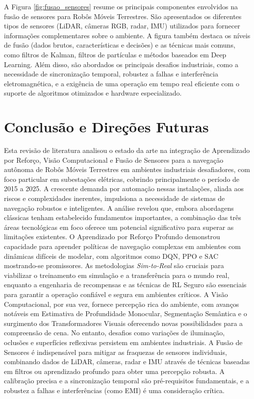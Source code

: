 A Figura \ref{fig:fusao_sensores} resume os principais componentes envolvidos na fusão de sensores para Robôs Móveis Terrestres. São apresentados os diferentes tipos de sensores (LiDAR, câmeras RGB, radar, IMU) utilizados para fornecer informações complementares sobre o ambiente. A figura também destaca os níveis de fusão (dados brutos, características e decisões) e as técnicas mais comuns, como filtros de Kalman, filtros de partículas e métodos baseados em Deep Learning. Além disso, são abordados os principais desafios industriais, como a necessidade de sincronização temporal, robustez a falhas e interferência eletromagnética, e a exigência de uma operação em tempo real eficiente com o suporte de algoritmos otimizados e hardware especializado.

\section{Conclusão e Direções Futuras}
Esta revisão de literatura analisou o estado da arte na integração de Aprendizado por Reforço, Visão Computacional e Fusão de Sensores para a navegação autônoma de Robôs Móveis Terrestres em ambientes industriais desafiadores, com foco particular em subestações elétricas, cobrindo principalmente o período de 2015 a 2025. A crescente demanda por automação nessas instalações, aliada aos riscos e complexidades inerentes, impulsiona a necessidade de sistemas de navegação robustos e inteligentes. A análise revelou que, embora abordagens clássicas tenham estabelecido fundamentos importantes, a combinação das três áreas tecnológicas em foco oferece um potencial significativo para superar as limitações existentes.
O Aprendizado por Reforço Profundo demonstrou capacidade para aprender políticas de navegação complexas em ambientes com dinâmicas difíceis de modelar, com algoritmos como DQN, PPO e SAC mostrando-se promissores. As metodologias \textit{Sim-to-Real} são cruciais para viabilizar o treinamento em simulação e a transferência para o mundo real, enquanto a engenharia de recompensas e as técnicas de \ac{RL} Seguro são essenciais para garantir a operação confiável e segura em ambientes críticos. A Visão Computacional, por sua vez, fornece percepção rica do ambiente, com avanços notáveis em Estimativa de Profundidade Monocular, Segmentação Semântica e o surgimento dos Transformadores Visuais oferecendo novas possibilidades para a compreensão de cena. No entanto, desafios como variações de iluminação, oclusões e superfícies reflexivas persistem em ambientes industriais. A Fusão de Sensores é indispensável para mitigar as fraquezas de sensores individuais, combinando dados de \ac{LiDAR}, câmeras, radar e \ac{IMU} através de técnicas baseadas em filtros ou aprendizado profundo para obter uma percepção robusta. A calibração precisa e a sincronização temporal são pré-requisitos fundamentais, e a robustez a falhas e interferências (como \ac{EMI}) é uma consideração crítica.
